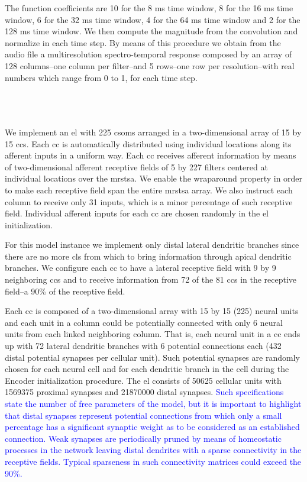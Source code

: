 \documentclass[10pt,letterpaper]{article}
\begin{document}
The function coefficients are 10 for the 8 ms time window, 8 for the 16 ms time window, 6 for the 32 ms time window, 4 for the 64 ms time window
and 2 for the 128 ms time window. We then compute the magnitude from the convolution and normalize in each time step.
By means of this procedure we obtain from the audio file a multiresolution spectro-temporal response composed by
an array of 128 columns--one column per filter--and 5 rows--one row per resolution--with real numbers which range from
0 to 1, for each time step.









~\\
~\\
~\\

We implement an \gls{el} with 225 \glspl{csom} arranged in a two-dimensional
array of 15 by 15 \glspl{cc}. Each \gls{cc} is automatically distributed using individual locations along its afferent inputs in a uniform way.
Each \gls{cc} receives afferent information by means of
two-dimensional afferent receptive fields of 5 by 227 filters centered at individual locations over the \gls{mrstsa}.
We enable the wraparound property in order to make each receptive field span the entire
\gls{mrstsa} array.
We also instruct each column to receive only 31 inputs, which is a minor percentage of such
receptive field.
Individual afferent inputs for each \gls{cc} are chosen randomly in the \gls{el} initialization. 

For this model instance we implement only distal lateral dendritic branches since there are
no more \glspl{cl} from which to bring information through apical dendritic branches.
We configure each \gls{cc} to have a lateral receptive field with 9 by 9 neighboring \glspl{cc}
and to receive information from 72 of the 81 \glspl{cc} in the receptive field--a 90\% of the receptive field.

Each \gls{cc} is composed of a two-dimensional array with 15 by 15 (225) neural units and
each unit in a column could be potentially connected with only 6 neural units from each linked neighboring column. 
That is, each neural unit in a \gls{cc} ends up with 72 lateral dendritic branches with 6 potential connections each
(432 distal potential synapses per cellular unit).
Such potential synapses are randomly chosen for each neural cell and for each dendritic branch in the cell during the Encoder initialization procedure.
The \gls{el} consists of 50625 cellular units with 1569375 proximal synapses and 21870000 distal synapses.
\textcolor{blue}{Such specifications state the number of free parameters of the model, but it is important to highlight that distal synapses represent
potential connections from which only a small percentage has a significant synaptic weight as to be considered as an established connection.
Weak synapses are periodically pruned by means of homeostatic processes in the network leaving distal dendrites with a sparse connectivity in the receptive fields.
Typical sparseness in such connectivity matrices could exceed the 90\%.}
\end{document}
